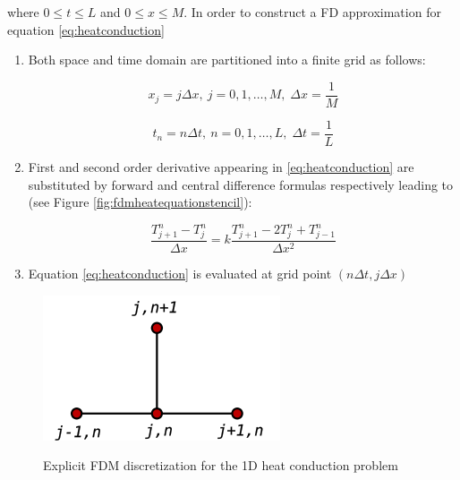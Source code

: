     where $0 \leq t \leq L$ and $0 \leq x \leq
    M$. 
 In order to construct a FD approximation for equation \ref{eq:heatconduction} 
 
 \begin{enumerate}
 
 \item Both space and time domain are partitioned into a finite grid as follows:
    
    \begin{equation}
    		x_j = j\Delta x, \: j = 0,1,\ldots,M,\;\Delta x = \frac{1}{M}
    \end{equation}

 \begin{equation}
    		t_n = n\Delta t, \: n = 0,1,\ldots,L,\; \Delta t= \frac{1}{L}
    \end{equation}  
    
 \item  First and second order derivative appearing in \ref{eq:heatconduction} are substituted by forward and central difference formulas respectively leading to (see Figure  \ref{fig:fdmheatequationstencil}):
 
 \begin{equation}
  \frac{T^n_{j+1} - T^n_{j}}{\Delta x} = k \frac{T^n_{j+1}- 2T^n_{j} + T^n_{j-1}}{\Delta x^2}
 \label{eq:discretizedheatequation}
 \end{equation}
 
 \item Equation \ref{eq:heatconduction} is evaluated at grid point $(n\Delta t, j \Delta x)$ 
    
\end{enumerate}    
    
\begin{figure}
\centering
\includegraphics[scale=0.5]{./images/CA_FDM/heatstencil}
\label{fig:fdmheatequationstencil}
\caption{Explicit FDM discretization for the 1D heat conduction problem}\label{torus}
\end{figure}    
    
